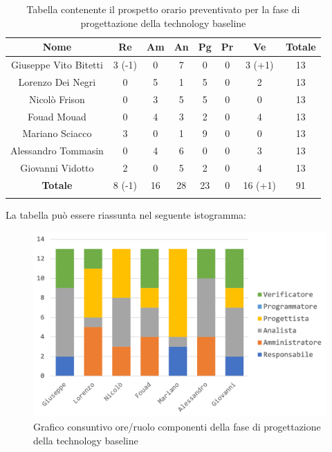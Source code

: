 			\begin{longtable}{|c|c|c|c|c|c|c|c}
				\hline
				\rowcolor{lighter-grayer}
				\textbf{Nome} & \textbf{Re} & \textbf{Am} & \textbf{An} & \textbf{Pg}  & \textbf{Pr}   & \textbf{Ve} & \textbf{Totale} \\
				\hline
				\endfirsthead
				\hline
				Giuseppe Vito Bitetti & 3 (-1) & 0 & 7 & 0 & 0 & 3 (+1) & 13\\
				\hline
				\hline
				Lorenzo Dei Negri & 0 & 5 & 1 & 5 & 0 & 2 & 13\\
				\hline
				\hline
				Nicolò Frison & 0 & 3 & 5 & 5 & 0 & 0 & 13\\
				\hline
				\hline
				Fouad Mouad & 0 & 4 & 3 & 2 & 0 & 4 & 13 \\
				\hline
				\hline
				Mariano Sciacco & 3 & 0 & 1 & 9 & 0 & 0 & 13\\
				\hline
				\hline
				Alessandro Tommasin & 0 & 4 & 6 & 0 & 0 & 3  & 13\\
				\hline
				\hline
				Giovanni Vidotto & 2 & 0 & 5 & 2 & 0 & 4 & 13\\
				\hline 
				\textbf{Totale} & 8 (-1) &  16 & 28 & 23 & 0 & 16 (+1) & 91 \\
				\hline
				
				\caption{Tabella contenente il prospetto orario preventivato per la fase di progettazione della technology baseline}
			\end{longtable}
			\pagebreak	
			
			La tabella può essere riassunta nel seguente istogramma:
			
			\begin{figure}[H]
				\centering
				\includegraphics[width=0.8\linewidth]{images/consuntivo/ConsCorrez1.png}
				\caption{Grafico consuntivo ore/ruolo componenti della fase di progettazione della technology baseline}
				\label{fig:consuntivo grafico suddivione ruoli fase di progettazione della technology baseline}
			\end{figure}
			
